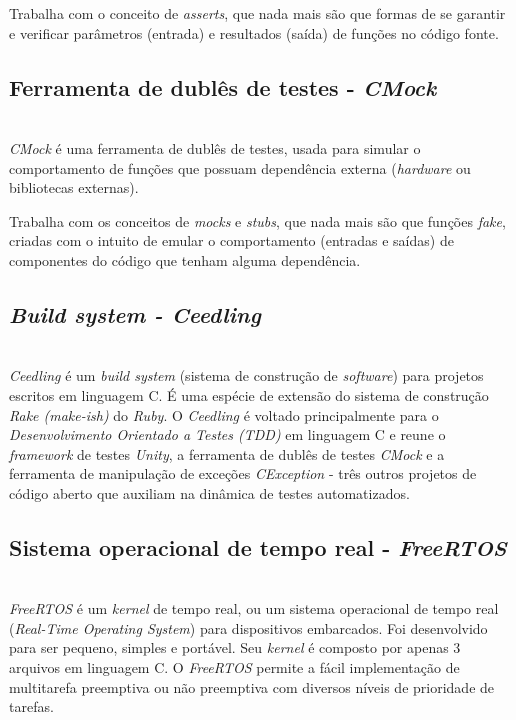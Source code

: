 \documentclass[times, twoside, watermark]{artigo}
\begin{document}
Trabalha com o conceito de \textit{asserts}, que nada mais são que formas de se 
garantir e verificar parâmetros (entrada) e resultados (saída) de funções no código 
fonte.\cite{unity}


\subsection{Ferramenta de dublês de testes - \textit{CMock}}\hfill\\

\textit{CMock} é uma ferramenta de dublês de testes, usada para simular o 
comportamento de funções que possuam dependência externa (\textit{hardware} ou 
bibliotecas externas).

Trabalha com os conceitos de \textit{mocks} e \textit{stubs}, 
que nada mais são que funções \textit{fake}, criadas com o intuito de emular o 
comportamento (entradas e saídas) de componentes do código que tenham alguma 
dependência.\cite{cmock}

\subsection{\textit{Build system - Ceedling}}\hfill\\

\textit{Ceedling} é um \textit{build system} (sistema de construção de 
\textit{software}) para projetos escritos em linguagem C.
É uma espécie de extensão do sistema de construção \textit{Rake (make-ish)} do 
\textit{Ruby}.
O \textit{Ceedling} é voltado principalmente para o 
\textit{Desenvolvimento Orientado a Testes (TDD)} em linguagem C e reune o 
\textit{framework} de testes \textit{Unity}, a ferramenta de dublês de testes 
\textit{CMock} e a ferramenta de manipulação de exceções \textit{CException} - três 
outros projetos de código aberto que auxiliam na dinâmica de testes 
automatizados\cite{gomes2016uttos}.

\subsection{Sistema operacional de tempo real - \textit{FreeRTOS}}\hfill\\

\textit{FreeRTOS} é um \textit{kernel} de tempo real, 
ou um sistema operacional de tempo real (\textit{Real-Time Operating System}) 
para dispositivos embarcados. Foi desenvolvido para ser pequeno, simples e portável. 
Seu \textit{kernel} é composto por apenas 3 arquivos em linguagem C. 
O \textit{FreeRTOS} permite a fácil implementação de multitarefa preemptiva 
ou não preemptiva com diversos níveis de prioridade de 
tarefas\cite{zhu2016understanding}.\hfill\\
\end{document}
